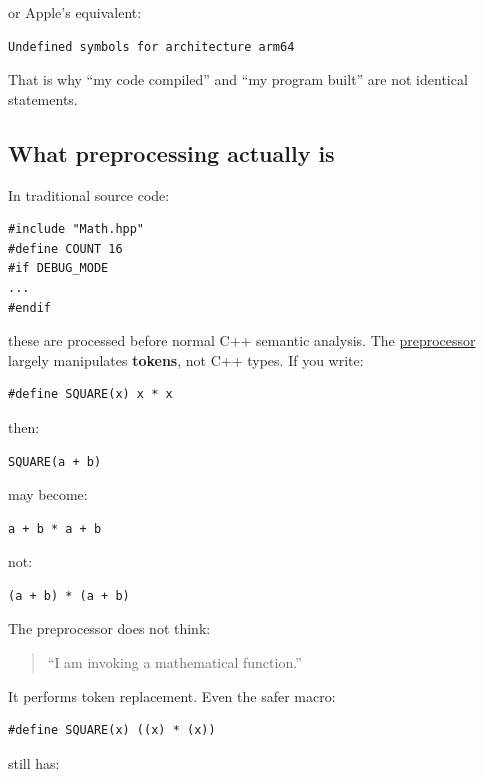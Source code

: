 or Apple's equivalent:

\begin{verbatim}
Undefined symbols for architecture arm64
\end{verbatim}

That is why ``my code compiled'' and ``my program built'' are not identical statements.

\subsection{What preprocessing actually is}\label{01-foundations-i-ch002-what-preprocessing-actually-is}

In traditional source code:

\begin{verbatim}
#include "Math.hpp"
#define COUNT 16
#if DEBUG_MODE
...
#endif
\end{verbatim}

these are processed before normal C++ semantic analysis. The \hyperref[appendix-33c0a92ce855]{preprocessor} largely manipulates \textbf{tokens}, not C++ types. If you write:

\begin{verbatim}
#define SQUARE(x) x * x
\end{verbatim}

then:

\begin{verbatim}
SQUARE(a + b)
\end{verbatim}

may become:

\begin{verbatim}
a + b * a + b
\end{verbatim}

not:

\begin{verbatim}
(a + b) * (a + b)
\end{verbatim}

The preprocessor does not think:

\begin{quote}
``I am invoking a mathematical function.''
\end{quote}

It performs token replacement. Even the safer macro:

\begin{verbatim}
#define SQUARE(x) ((x) * (x))
\end{verbatim}

still has:

